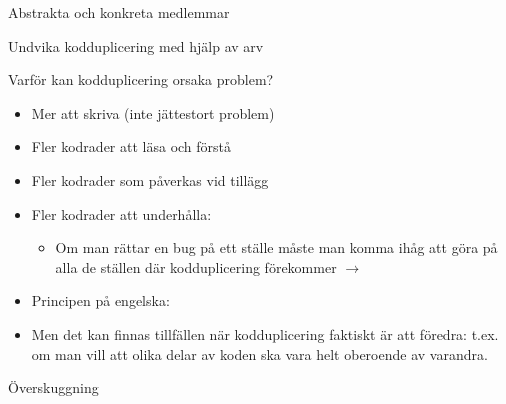 \begin{Slide}{Abstrakta och konkreta medlemmar}
\vspace{-0.5em}
\end{Slide}


\begin{Slide}{Undvika kodduplicering med hjälp av arv}
\end{Slide}




\begin{Slide}{Varför kan kodduplicering orsaka problem?}
\begin{itemize}
\item Mer att skriva (inte jättestort problem)
\pause
\item Fler kodrader att läsa och förstå
\pause
\item Fler kodrader som påverkas vid tillägg
\pause

\item Fler kodrader att underhålla:
\begin{itemize}
\item Om man rättar en bug på ett ställe måste man komma ihåg att göra  på alla de ställen där kodduplicering förekommer $\rightarrow$ 
\end{itemize}

\pause

\item Principen på engelska: 

\pause

\item {Men det kan finnas tillfällen när kodduplicering faktiskt är att föredra: t.ex. om man vill att olika delar av koden ska vara helt oberoende av varandra.}
\end{itemize}
\end{Slide}




\begin{Slide}{Överskuggning}
\vspace{-0.5em}
\end{Slide}

